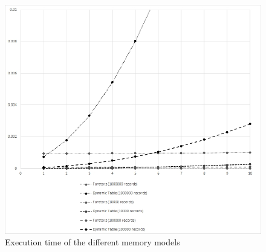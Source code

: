 \begin{figure}
	\includegraphics[width = \columnwidth]{Figures/chart.jpg}
	\caption{Execution time of the different memory models}
	\label{fig:chart}
\end{figure}